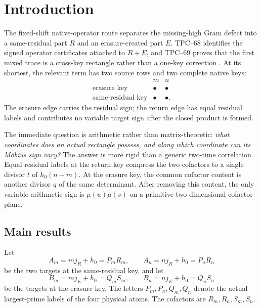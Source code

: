 \section{Introduction}
\label{sec:introduction}

The fixed-shift native-operator route separates the missing-high Gram
defect into a same-residual part \(R\) and an erasure-created part \(E\).
TPC--68 identifies the signed operator certificates attached to
\(R+E\), and TPC--69 proves that the first mixed trace is a cross-key
rectangle rather than a one-key correction
\citep{WangTPC68,WangTPC69}.  At its shortest, the relevant term has two
source rows and two complete native keys:
\[
 \begin{matrix}
     &m&n\\
 \text{erasure key}&\bullet&\bullet\\
 \text{same-residual key}&\bullet&\bullet .
 \end{matrix}
\]
The erasure edge carries the residual sign; the return edge has equal
residual labels and contributes no variable target sign after the closed
product is formed.

The immediate question is arithmetic rather than matrix-theoretic:
\emph{what coordinates does an actual rectangle possess, and along which
coordinate can its M\"obius sign vary?}  The answer is more rigid than a
generic two-time correlation.  Equal residual labels at the return key
compress the two cofactors to a single divisor \(t\) of
\(h_0(n-m)\).  At the erasure key, the common cofactor content is another
divisor \(q\) of the same determinant.  After removing this content, the
only variable arithmetic sign is \(\mu(u)\mu(v)\) on a primitive
two-dimensional cofactor plane.

\subsection{Main results}

Let
\[
 A_m=mj_R+h_0=P_mR_m,\qquad
 A_n=nj_R+h_0=P_nR_n
\]
be the two targets at the same-residual key, and let
\[
 B_m=mj_E+h_0=Q_mS_m,\qquad
 B_n=nj_E+h_0=Q_nS_n
\]
be the targets at the erasure key.  The letters \(P_m,P_n,Q_m,Q_n\)
denote the actual largest-prime labels of the four physical atoms.  The
cofactors are \(R_m,R_n,S_m,S_n\).

